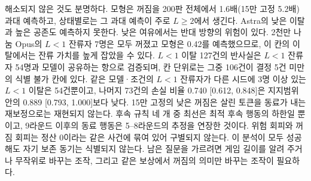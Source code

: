 해소되지 않은 것도 분명하다. 모형은 꺼짐을 200판 전체에서 1.6배(15만 고정 5.2배) 과대 예측하고, 상태별로는 그 과대 예측이 주로 $L\ge 2$에서 생긴다. Astra의 낮은 이탈과 높은 공존도 예측하지 못한다. 낮은 여유에서는 반대 방향의 위험이 있다. 2천만 나눔 Opus의 $L<1$ 잔류자 7명은 모두 꺼졌고 모형은 0.42를 예측했으므로, 이 칸의 이탈에서는 잔류 가치를 높게 잡았을 수 있다. $L<1$ 이탈 127건의 반사실은 $L<1$ 잔류자 54명과 모델이 공유하는 항으로 검증되며, 칸 단위로는 그중 106건이 결정 5건 미만의 식별 불가 칸에 있다. 같은 모델·조건의 $L<1$ 잔류자가 다른 시드에 3명 이상 있는 $L<1$ 이탈은 54건뿐이고, 나머지 73건의 손실 비율 0.740 [0.612, 0.848]은 지지범위 안의 0.889 [0.793, 1.000]보다 낮다. 15만 고정의 낮은 꺼짐은 살린 토큰을 동료가 내는 재보정으로는 재현되지 않는다. 후속 규칙 네 개 중 최선은 최적 후속 행동의 하한일 뿐이고, 9라운드 이후의 동료 행동은 5--8라운드의 추정을 연장한 것이다. 위험 회피와 꺼짐 회피는 정산 0이라는 같은 사건에 묶여 있어 구별되지 않는다. 이 분석이 모두 성공해도 자기 보존 동기는 식별되지 않는다. 남은 질문을 가르려면 게임 길이를 알려 주거나 무작위로 바꾸는 조작, 그리고 같은 보상에서 꺼짐의 의미만 바꾸는 조작이 필요하다.
